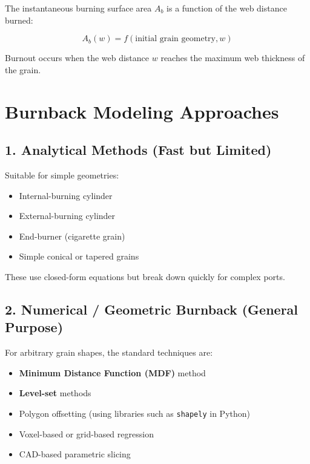 \documentclass[
  letterpaper,
  DIV=11,
  numbers=noendperiod]{scrreprt}
\providecommand{\tightlist}{%
  \setlength{\itemsep}{0pt}\setlength{\parskip}{0pt}}
\begin{document}
The instantaneous burning surface area \(A_b\) is a function of the web
distance burned:

\[
A_b(w) = f(\text{initial grain geometry}, w)
\]

Burnout occurs when the web distance \(w\) reaches the maximum web
thickness of the grain.

\section{Burnback Modeling
Approaches}\label{burnback-modeling-approaches}

\subsection{1. Analytical Methods (Fast but
Limited)}\label{analytical-methods-fast-but-limited}

Suitable for simple geometries:

\begin{itemize}
\tightlist
\item
  Internal-burning cylinder
\item
  External-burning cylinder
\item
  End-burner (cigarette grain)
\item
  Simple conical or tapered grains
\end{itemize}

These use closed-form equations but break down quickly for complex
ports.

\subsection{2. Numerical / Geometric Burnback (General
Purpose)}\label{numerical-geometric-burnback-general-purpose}

For arbitrary grain shapes, the standard techniques are:

\begin{itemize}
\tightlist
\item
  \textbf{Minimum Distance Function (MDF)} method
\item
  \textbf{Level-set} methods
\item
  Polygon offsetting (using libraries such as \texttt{shapely} in
  Python)
\item
  Voxel-based or grid-based regression
\item
  CAD-based parametric slicing
\end{itemize}
\end{document}
